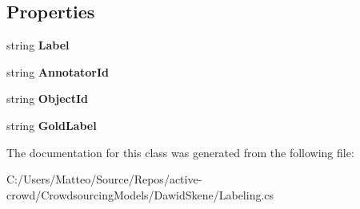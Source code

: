 \subsection*{Properties}
\begin{DoxyCompactItemize}
\item 
\hypertarget{class_get_another_label_1_1_labeling_a22abeb51bc81fb8fe913f83bffc86177}{}string {\bfseries Label}\label{class_get_another_label_1_1_labeling_a22abeb51bc81fb8fe913f83bffc86177}

\item 
\hypertarget{class_get_another_label_1_1_labeling_a96d96422218d574ea4d3a7b70661a548}{}string {\bfseries Annotator\+Id}\label{class_get_another_label_1_1_labeling_a96d96422218d574ea4d3a7b70661a548}

\item 
\hypertarget{class_get_another_label_1_1_labeling_a1b5e444811a20dab08286ba8ccd1821e}{}string {\bfseries Object\+Id}\label{class_get_another_label_1_1_labeling_a1b5e444811a20dab08286ba8ccd1821e}

\item 
\hypertarget{class_get_another_label_1_1_labeling_aaa17ca07d2091e9b8319c387d9e33164}{}string {\bfseries Gold\+Label}\label{class_get_another_label_1_1_labeling_aaa17ca07d2091e9b8319c387d9e33164}

\end{DoxyCompactItemize}


The documentation for this class was generated from the following file\+:\begin{DoxyCompactItemize}
\item 
C\+:/\+Users/\+Matteo/\+Source/\+Repos/active-\/crowd/\+Crowdsourcing\+Models/\+Dawid\+Skene/Labeling.\+cs\end{DoxyCompactItemize}
